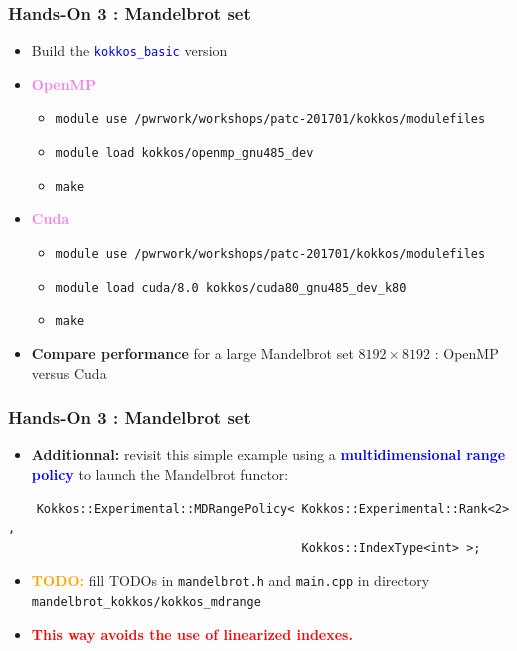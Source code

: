 \begin{frame}[fragile=singleslide]
  \frametitle{Hands-On 3 : Mandelbrot set}

  \begin{itemize}
  \item Build the \textcolor{blue}{\texttt{kokkos\_basic}} version
  \item \textcolor{violet}{\textbf{OpenMP}}
    \begin{itemize}
    \item \texttt{module use /pwrwork/workshops/patc-201701/kokkos/modulefiles}
    \item \texttt{module load kokkos/openmp\_gnu485\_dev}
    \item \texttt{make}
    \end{itemize}
  \item \textcolor{violet}{\textbf{Cuda}}
    \begin{itemize}
    \item \texttt{module use /pwrwork/workshops/patc-201701/kokkos/modulefiles}
    \item \texttt{module load cuda/8.0 kokkos/cuda80\_gnu485\_dev\_k80}
    \item \texttt{make}
    \end{itemize}
  \item \textbf{Compare performance} for a large Mandelbrot set $8192\times 8192$ : OpenMP versus Cuda
  \end{itemize}

\end{frame}
  
\begin{frame}[fragile=singleslide]
  \frametitle{Hands-On 3 : Mandelbrot set}

  \begin{itemize}
  \item {\bf Additionnal:} revisit this simple example using a \textcolor{blue}{\bf multidimensional range policy} to launch the Mandelbrot functor:
  \end{itemize}
  \begin{verbatim}
    Kokkos::Experimental::MDRangePolicy< Kokkos::Experimental::Rank<2> ,
                                         Kokkos::IndexType<int> >;
  \end{verbatim}
  \begin{itemize}
  \item \textcolor{orange}{\textbf{TODO:}} fill TODOs in \texttt{mandelbrot.h} and \texttt{main.cpp} in directory \texttt{mandelbrot\_kokkos/kokkos\_mdrange}
  \item \textcolor{red}{\bf This way avoids the use of linearized indexes.}
  \end{itemize}

\end{frame}

